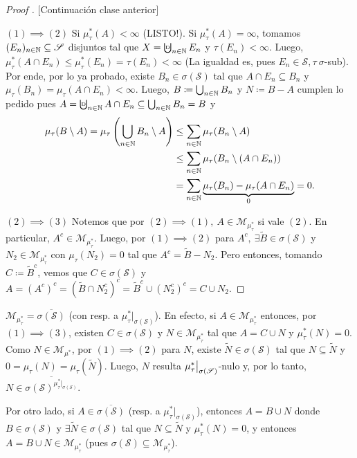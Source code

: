 
\begin{proof}[Proof ][Continuación clase anterior]
	\text{} \par
	$\boxed{(1) \implies (2)}$ Si $\mu_{\tau}^{*}(A) < \infty$ (LISTO!). Si $\mu_{\tau}^{*}(A) = \infty$, tomamos $(E_n)_{n\in\mathbb{N}} \subseteq \mathscr{S}$ disjuntos tal que $X = \textbigcupd_{n\in\N} E_n$ y $\tau(E_n) < \infty$. Luego, $\mu_{\tau}^{*}(A \cap E_n) \leq \mu_{\tau}^{*} (E_n) = \tau(E_n) < \infty$ (La igualdad es, pues $E_n \in \mathscr{S}, \tau \ \sigma$-sub). Por ende, por lo ya probado, existe $B_n \in \sigma(\mathscr{S})$ tal que $A \cap E_n \subseteq B_n$ y $\mu_{\tau}(B_n) = \mu_{\tau}(A \cap E_n) < \infty$. Luego, $B \coloneq \bigcup_{n\in\mathbb{N}} B_n$ y $N \coloneq B-A$ cumplen lo pedido pues $A = \textbigcupd_{n\in\N} A \cap E_n \subseteq \bigcup_{n\in\N} B_n = B$ y
	\begin{align*}
		\mu_{\tau}(B\setminus A) = \mu_{\tau}\left( \bigcup_{n\in\mathbb{N}} B_n \setminus A \right) & \leq \sum_{n\in\mathbb{N}} \mu_{\tau}(B_n \setminus A) \\
		& \leq \sum_{n\in\mathbb{N}} \mu_{\tau}(B_n \setminus (A \cap E_n)) \\
		&= \sum_{n\in\mathbb{N}} \underbrace{\mu_{\tau}(B_n) - \mu_{\tau}(A \cap E_n)}_{0} = 0 
	.\end{align*}

	$\boxed{(2) \implies (3)}$ Notemos que por $(2) \implies (1),\ A \in \mathscr{M}_{\mu_{\tau}^{*}}$ si vale $(2)$. En particular, $A^c \in \mathscr{M}_{\mu_{\tau}^{*}}$. Luego, por $(1) \implies (2)$ para $A^c,\ \exists \widetilde{B} \in \sigma(\mathscr{S})$ y $N_2 \in \mathscr{M}_{\mu_{\tau}^{*}}$ con $\mu_{\tau}(N_{2}) = 0$ tal que $A^c = \widetilde{B} - N_{2}$. Pero entonces, tomando $C \coloneq \widetilde{B}^c$, vemos que $C \in \sigma(\mathscr{S})$ y $A = (A^c)^c = (\widetilde{B} \cap N_{2}^c)^c = \widetilde{B}^c \cup (N_{2}^c)^c = C \cup N_2$.
\end{proof}
\medskip
\begin{remark}
	$\mathscr{M}_{\mu_{\tau}^{*}} = \overline{\sigma(\mathscr{S})}$ (con resp. a $\mu_{\tau}^{*}|_{\sigma(\mathscr{S})}$). En efecto, si $A \in \mathscr{M}_{\mu_{\tau}^{*}}$ entonces, por $(1) \implies (3)$, existen $C \in \sigma(\mathscr{S})$ y $N \in \mathscr{M}_{\mu_{\tau}^{*}}$ tal que $A = C \cup N$ y $\mu_{\tau}^{*}(N) = 0$. Como $N \in \mathscr{M}_{\mu^{*}}$, por $(1) \implies (2)$ para $N$, existe $\widetilde{N} \in \sigma(\mathscr{S})$ tal que $N \subseteq \widetilde{N}$ y $0 = \mu_{\tau}(N) = \mu_{\tau}(\widetilde{N})$. Luego, $N$ resulta $\mu_{\tau}^{*}\big{|}_{\sigma(\mathscr{S})}$-nulo y, por lo tanto, $N \in \overline{\sigma(\mathscr{S})^{\mu_{\tau}^{*}|_{\sigma(\mathscr{S})}}}$. \par
	
	Por otro lado, si $A \in \overline{\sigma(\mathscr{S})}$ (resp. a $\mu_{\tau}^{*}|_{\sigma(\mathscr{S})}$), entonces $A = B \cup N$ donde $B \in \sigma(\mathscr{S})$ y $\exists \widetilde{N} \in \sigma(\mathscr{S})$ tal que $N \subseteq \widetilde{N}$ y $\mu_{\tau}^{*}(N) = 0$, y entonces $A = B \cup N \in \mathscr{M}_{\mu_{\tau}^{*}}$ (pues $\sigma(\mathscr{S}) \subseteq \mathscr{M}_{\mu_{\tau}^{*}}$).
\end{remark}

